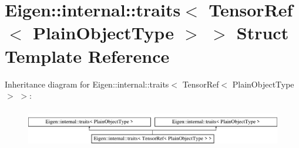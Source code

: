 \hypertarget{struct_eigen_1_1internal_1_1traits_3_01_tensor_ref_3_01_plain_object_type_01_4_01_4}{}\section{Eigen\+:\+:internal\+:\+:traits$<$ Tensor\+Ref$<$ Plain\+Object\+Type $>$ $>$ Struct Template Reference}
\label{struct_eigen_1_1internal_1_1traits_3_01_tensor_ref_3_01_plain_object_type_01_4_01_4}
Inheritance diagram for Eigen\+:\+:internal\+:\+:traits$<$ Tensor\+Ref$<$ Plain\+Object\+Type $>$ $>$\+:\begin{figure}[H]
\begin{center}
\leavevmode
\includegraphics[height=1.686747cm]{struct_eigen_1_1internal_1_1traits_3_01_tensor_ref_3_01_plain_object_type_01_4_01_4}
\end{center}
\end{figure}
